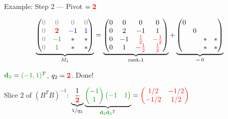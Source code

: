 \documentclass[10pt]{beamer}
\theoremstyle{definition}
\newcommand{\pvt}[1]{{\color{red}\mathbf{#1}}}       %
\newcommand{\crs}[1]{{\color{blue}#1}}                %
\newcommand{\gn}[1]{{\color{green!60!black}#1}}       %
\newcommand{\rd}[1]{{\color{red}#1}}                  %
\newcommand{\gz}{{\color{gray}0}}                      %
\begin{document}
\begin{frame}{Example: Step 2 — Pivot $= \pvt{2}$}

$$\underbrace{\begin{pmatrix} \gz & \gz & \gz & \gz \\ \gz & \pvt{2} & \crs{-1} & \crs{1} \\ \gz & \gn{-1} & * & * \\ \gz & \gn{1} & * & * \end{pmatrix}}_{M_1}
= \underbrace{\begin{pmatrix} 0 & 0 & 0 & 0 \\ 0 & 2 & -1 & 1 \\ 0 & -1 & \rd{\tfrac{1}{2}} & \rd{-\tfrac{1}{2}} \\ 0 & 1 & \rd{-\tfrac{1}{2}} & \rd{\tfrac{1}{2}} \end{pmatrix}}_{\text{rank-1}}
+ \underbrace{\begin{pmatrix} 0 \\ & 0 \\ & & * & * \\ & & * & * \end{pmatrix}}_{=\,0}$$

\vspace{0.3em}

$\gn{\mathbf{d}_2} = \gn{(-1, 1)}^T$, \; $q_2 = \pvt{2}$. \; Done!

\vspace{0.2em}

Slice 2 of $(B^TB)^{-1}$: \; $\underbrace{\dfrac{1}{\pvt{2}}}_{1/q_2}\underbrace{\gn{\begin{pmatrix}-1\\1\end{pmatrix}\begin{pmatrix}-1&1\end{pmatrix}}}_{\gn{\mathbf{d}_2}\gn{\mathbf{d}_2}^T} = \rd{\begin{pmatrix} 1/2 & -1/2 \\ -1/2 & 1/2 \end{pmatrix}}$

\end{frame}
\end{document}
